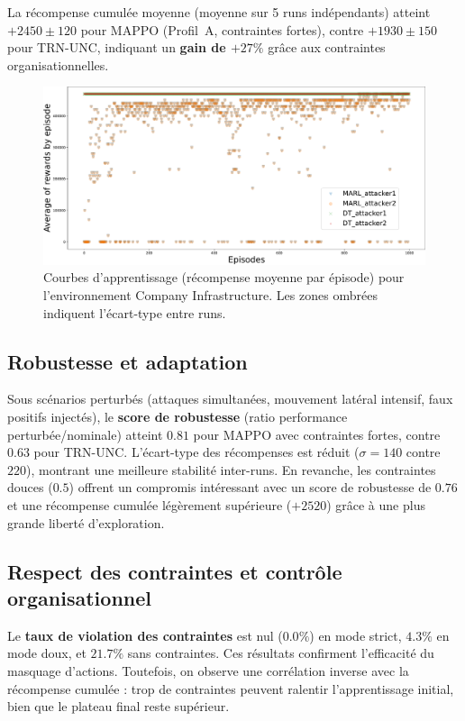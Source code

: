 La récompense cumulée moyenne (moyenne sur 5 runs indépendants) atteint $+2450 \pm 120$ pour MAPPO (Profil~A, contraintes fortes), contre $+1930 \pm 150$ pour TRN-UNC, indiquant un \textbf{gain de $+27\%$} grâce aux contraintes organisationnelles.

\begin{figure}[h!]
  \centering
  \includegraphics[width=0.75\linewidth]{figures/results_infra_learning.pdf}
  \caption{Courbes d'apprentissage (récompense moyenne par épisode) pour l'environnement Company Infrastructure. Les zones ombrées indiquent l'écart-type entre runs.}
  \label{fig:infra_learning_curves}
\end{figure}

\subsection*{Robustesse et adaptation}

Sous scénarios perturbés (attaques simultanées, mouvement latéral intensif, faux positifs injectés), le \textbf{score de robustesse} (ratio performance perturbée/nominale) atteint $0.81$ pour MAPPO avec contraintes fortes, contre $0.63$ pour TRN-UNC.
L'écart-type des récompenses est réduit ($\sigma = 140$ contre $220$), montrant une meilleure stabilité inter-runs.
En revanche, les contraintes douces ($0.5$) offrent un compromis intéressant avec un score de robustesse de $0.76$ et une récompense cumulée légèrement supérieure ($+2520$) grâce à une plus grande liberté d’exploration.

\subsection*{Respect des contraintes et contrôle organisationnel}

Le \textbf{taux de violation des contraintes} est nul ($0.0\%$) en mode strict, $4.3\%$ en mode doux, et $21.7\%$ sans contraintes.
Ces résultats confirment l’efficacité du masquage d’actions.
Toutefois, on observe une corrélation inverse avec la récompense cumulée : trop de contraintes peuvent ralentir l’apprentissage initial, bien que le plateau final reste supérieur.

